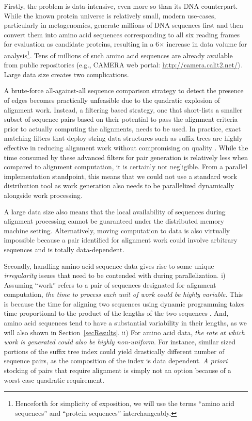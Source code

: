 \documentclass[10pt,journal,letterpaper,compsoc]{IEEEtran}
\begin{document}
Firstly, the problem is data-intensive, even more so than its DNA counterpart. While the known protein universe is relatively small, modern use-cases, particularly in metagenomics, generate millions of DNA sequences first and then convert them into amino acid sequences corresponding to all six reading frames for evaluation as candidate proteins, resulting in a 6$\times$ increase in data volume for analysis\footnote{Henceforth for simplicity of exposition, we will use the terms ``amino acid sequences'' and ``protein sequences'' interchangeably.}. Tens of millions of such amino acid sequences are already available from public repositories (e.g., CAMERA web portal: \url{http://camera.calit2.net/}). Large data size creates two complications.  
\begin{compactenum}[i)]
\item
 A brute-force all-against-all sequence comparison strategy to detect the presence of edges becomes practically unfeasible due to the quadratic explosion of alignment work. Instead, a filtering based strategy, one that short-lists a smaller subset of sequence pairs based on their potential to pass the alignment criteria prior to actually computing the alignments, needs to be used. In practice, exact matching filters that deploy string data structures such as suffix trees \cite{Weiner73} are highly effective in reducing alignment work without compromising on quality \cite{KalyanaramanJPDC07,KalyanaramanNAR03}. While the time consumed by these advanced filters for pair generation is relatively less when compared to alignment computation, it is certainly not negligible. From a parallel implementation standpoint, this means that we could not use a standard work distribution tool as work generation also needs to be parallelized dynamically alongside work processing. 
\item
A large data size also means that the local availability of sequences during alignment processing cannot be guaranteed under the distributed memory machine setting. Alternatively, moving computation to data is also virtually impossible because a pair identified for alignment work could involve arbitrary sequences and is totally data-dependent. 
\end{compactenum}

Secondly, handling amino acid sequence data gives rise to some unique \emph{irregularity} issues that need to be contended with during parallelization. i) Assuming ``work'' refers to a pair of sequences designated for alignment computation, \emph{the time to process each unit of work could be highly variable}. This is because the time for aligning two sequences using dynamic programming takes time proportional to the product of the lengths of the two sequences \cite{Needleman70,Smith81}. And, amino acid sequences tend to have a substantial variability in their lengths, as we will also shown in Section~\ref{secResults}. 
ii) For amino acid data, \emph{the rate at which work is generated could also be highly non-uniform}. For instance, similar sized portions of the suffix tree index could yield drastically different number of sequence pairs, as the composition of the index is data dependent. {\it A priori} stocking of pairs that require alignment is simply not an option because of a worst-case quadratic requirement.
\end{document}
